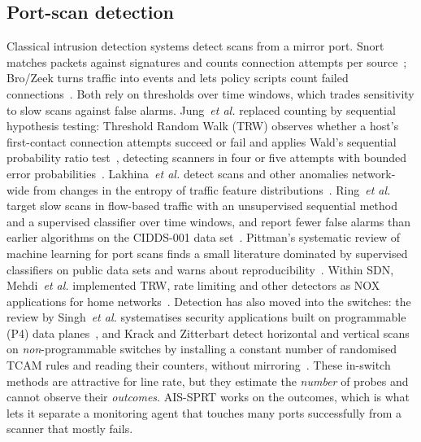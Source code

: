 \documentclass[conference]{IEEEtran}
\begin{document}
\subsection{Port-scan detection}
Classical intrusion detection systems detect scans from a mirror port. Snort matches packets against signatures and
counts connection attempts per source~\cite{roesch1999snort}; Bro/Zeek turns traffic into events and lets policy scripts
count failed connections~\cite{paxson1999bro}. Both rely on thresholds over time windows, which trades sensitivity to slow
scans against false alarms. Jung~\emph{et al.} replaced counting by sequential hypothesis testing: Threshold Random Walk
(TRW) observes whether a host's first-contact connection attempts succeed or fail and applies Wald's sequential probability
ratio test~\cite{wald1945sequential}, detecting scanners in four or five attempts with bounded error
probabilities~\cite{jung2004trw}. Lakhina~\emph{et al.} detect scans and other anomalies network-wide from changes in the
entropy of traffic feature distributions~\cite{lakhina2005mining}. Ring~\emph{et al.} target slow scans in flow-based
traffic with an unsupervised sequential method and a supervised classifier over time windows, and report fewer false
alarms than earlier algorithms on the CIDDS-001 data set~\cite{ring2018slow}. Pittman's systematic review of machine
learning for port scans finds a small literature dominated by supervised classifiers on public data sets and warns about
reproducibility~\cite{pittman2023ml}. Within SDN, Mehdi~\emph{et al.} implemented TRW, rate limiting and other
detectors as NOX applications for home networks~\cite{mehdi2011revisiting}. Detection has also moved into the switches:
the review by Singh~\emph{et al.} systematises security applications built on programmable (P4) data
planes~\cite{singh2025programmable}, and Krack and Zitterbart detect horizontal and vertical scans on
\emph{non}-programmable switches by installing a constant number of randomised TCAM rules and reading their counters,
without mirroring~\cite{krack2025portest}. These in-switch methods are attractive for line rate, but they estimate the
\emph{number} of probes and cannot observe their \emph{outcomes}. AIS-SPRT works on the outcomes, which is what lets it
separate a monitoring agent that touches many ports successfully from a scanner that mostly fails.
\end{document}
